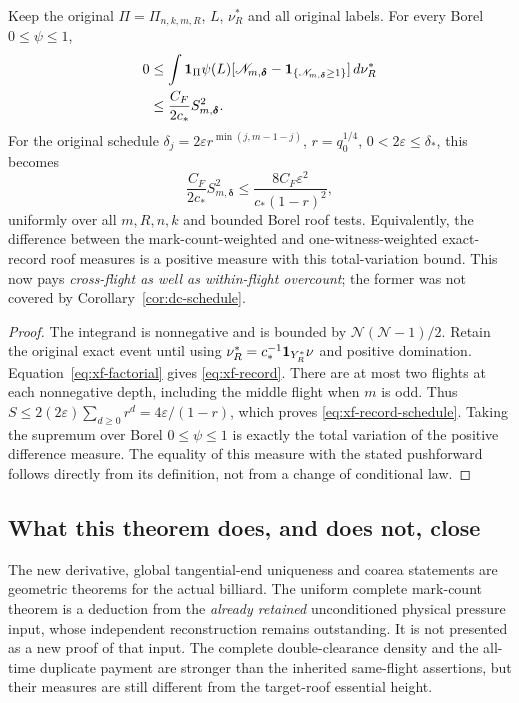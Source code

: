 \begin{corollary}
\label{cor:xf-record}
Keep the original $\Pi=\Pi_{n,k,m,R}$, $L$, $\nu_R^*$ and all
original labels. For every Borel $0\le\psi\le1$,
\begin{align}
 0&\le\int\mathbf1_\Pi\psi(L)
             [\mathscr N_{m,\boldsymbol\delta}
                -\mathbf1_{\{\mathscr N_{m,\boldsymbol\delta}\ge1\}}]
                                              \,d\nu_R^*\notag\\
  &\le\frac{C_F}{2c_*}S_{m,\boldsymbol\delta}^2.
                                             \label{eq:xf-record}
\end{align}
For the original schedule
$\delta_j=2\varepsilon r^{\min(j,m-1-j)}$,
$r=q_0^{1/4}$, $0<2\varepsilon\le\delta_*$, this becomes
\begin{equation}\label{eq:xf-record-schedule}
 \frac{C_F}{2c_*}S_{m,\boldsymbol\delta}^2
       \le\frac{8C_F\varepsilon^2}{c_*(1-r)^2},
\end{equation}
uniformly over all $m,R,n,k$ and bounded Borel roof tests.
Equivalently, the difference between the mark-count-weighted and
one-witness-weighted exact-record roof measures is a positive
measure with this total-variation bound. This now pays
\emph{cross-flight as well as within-flight overcount}; the former
was not covered by Corollary~\ref{cor:dc-schedule}.
\end{corollary}
\begin{proof}
The integrand is nonnegative and is bounded by
$\mathscr N(\mathscr N-1)/2$. Retain the original exact event
until using $\nu_R^*=c_*^{-1}\mathbf1_{Y_R^*}\nu$ and positive
domination. Equation~\eqref{eq:xf-factorial} gives
\eqref{eq:xf-record}. There are at most two flights at each
nonnegative depth, including the middle flight when $m$ is odd.
Thus $S\le2(2\varepsilon)\sum_{d\ge0}r^d=4\varepsilon/(1-r)$,
which proves \eqref{eq:xf-record-schedule}. Taking the supremum
over Borel $0\le\psi\le1$ is exactly the total variation of the
positive difference measure. The equality of this measure with the
stated pushforward follows directly from its definition, not from
a change of conditional law.
\end{proof}

\subsection{What this theorem does, and does not, close}
The new derivative, global tangential-end uniqueness and coarea
statements are geometric theorems for the actual billiard. The
uniform complete mark-count theorem is a deduction from the
\emph{already retained} unconditioned physical pressure input, whose
independent reconstruction remains outstanding. It is not presented
as a new proof of that input. The complete double-clearance density
and the all-time duplicate payment are stronger than the inherited
same-flight assertions, but their measures are still different from
the target-roof essential height.

